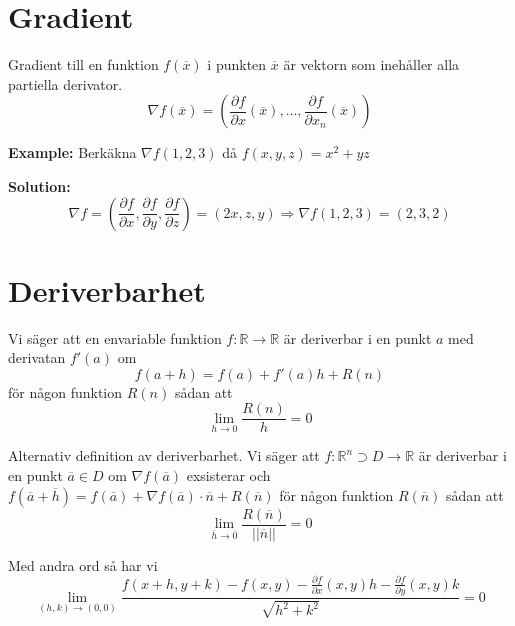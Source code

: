 \section{Gradient}
Gradient till en funktion $f(\overline{x})$ i punkten $\overline{x}$ är 
vektorn som inehåller alla partiella derivator.
\begin{equation}
    \nabla f(\overline{x}) = \left( \frac{\partial f}{\partial x}(\overline{x}), \ldots, \frac{\partial f}{\partial x_n}(\overline{x}) \right)
\end{equation}

\textbf{Example:}
Berkäkna $\nabla f(1,2,3)$ då $f(x,y,z)=x^2+yz$

\textbf{Solution:}
\begin{equation*}
    \nabla f = \left( \frac{\partial f}{\partial x}, \frac{\partial f}{\partial y}, \frac{\partial f}{\partial z} \right)
    = (2x, z, y) \Rightarrow \nabla f(1,2,3) = (2,3,2)
\end{equation*}


\section{Deriverbarhet}
Vi säger att en envariable funktion $f:\mathbb{R}\to\mathbb{R}$ är deriverbar i en punkt 
$a$ med derivatan $f'(a)$ om
\begin{equation*}
    f(a+h) = f(a) + f'(a)h +R(n)
\end{equation*}
för någon funktion $R(n)$ sådan att
\begin{equation*}
    \lim_{h\to0} \frac{R(n)}{h} = 0
\end{equation*}

Alternativ definition av deriverbarhet.
Vi säger att $f:\mathbb{R}^n\supset D\to\mathbb{R}$ är deriverbar i 
en punkt $\overline{a} \in D$ om $\nabla f(\overline{a})$ exsisterar
och $f(\overline{a}+\overline{h}) = f(\overline{a}) + \nabla f(\overline{a})\cdot\overline{n} + R(\overline{n})$
för någon funktion $R(\overline{n})$ sådan att
\begin{equation*}
    \lim_{\overline{h}\to\overline{0}}\frac{R(\overline{n})}{||\overline{n}||} = 0
\end{equation*}

Med andra ord så har vi
\begin{equation*}
    \lim_{(h,k)\to(0,0)}\frac{f(x+h,y+k) - f(x,y) - \frac{\partial f}{\partial x}(x,y)h - \frac{\partial f}{\partial y}(x,y)k}{\sqrt{h^2+k^2}} = 0
\end{equation*}



